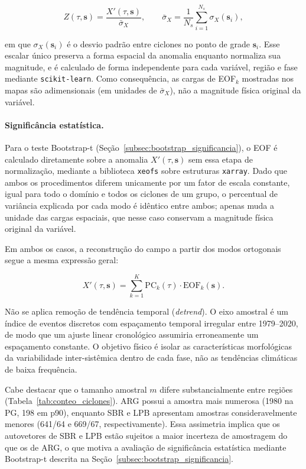 \begin{equation}\label{eq:eof_normalizacion}
    Z(\tau, \mathbf{s}) = \frac{X'(\tau, \mathbf{s})}{\bar{\sigma}_X}, \qquad \bar{\sigma}_X = \frac{1}{N_s}\sum_{i=1}^{N_s} \sigma_X(\mathbf{s}_i),
\end{equation}

em que $\sigma_X(\mathbf{s}_i)$ é o desvio padrão entre ciclones no ponto de grade $\mathbf{s}_i$. Esse escalar único preserva a forma espacial da anomalia enquanto normaliza sua magnitude, e é calculado de forma independente para cada variável, região e fase mediante \texttt{scikit-learn}. Como consequência, as cargas de EOF$_k$ mostradas nos mapas são adimensionais (em unidades de $\bar\sigma_X$), não a magnitude física original da variável.

\paragraph{Significância estatística.} Para o teste Bootstrap-t (Seção~\ref{subsec:bootstrap_significancia}), o EOF é calculado diretamente sobre a anomalia $X'(\tau,\mathbf{s})$ sem essa etapa de normalização, mediante a biblioteca \texttt{xeofs} \citep{rieger2024xeofs} sobre estruturas \texttt{xarray}. Dado que ambos os procedimentos diferem unicamente por um fator de escala constante, igual para todo o domínio e todos os ciclones de um grupo, o percentual de variância explicada por cada modo é idêntico entre ambos; apenas muda a unidade das cargas espaciais, que nesse caso conservam a magnitude física original da variável.

Em ambos os casos, a reconstrução do campo a partir dos modos ortogonais segue a mesma expressão geral:

\begin{equation}\label{eq:eof_reconstruccion}
    X'(\tau, \mathbf{s}) = \sum_{k=1}^{K} \text{PC}_k(\tau) \cdot \text{EOF}_k(\mathbf{s}).
\end{equation}

Não se aplica remoção de tendência temporal (\textit{detrend}). O eixo amostral é um índice de eventos discretos com espaçamento temporal irregular entre 1979--2020, de modo que um ajuste linear cronológico assumiria erroneamente um espaçamento constante. O objetivo físico é isolar as características morfológicas da variabilidade inter-sistêmica dentro de cada fase, não as tendências climáticas de baixa frequência.

Cabe destacar que o tamanho amostral $m$ difere substancialmente entre regiões (Tabela~\ref{tab:conteo_ciclones}). ARG possui a amostra mais numerosa (1980 na PG, 198 em p90), enquanto SBR e LPB apresentam amostras consideravelmente menores (641/64 e 669/67, respectivamente). Essa assimetria implica que os autovetores de SBR e LPB estão sujeitos a maior incerteza de amostragem do que os de ARG, o que motiva a avaliação de significância estatística mediante Bootstrap-t descrita na Seção~\ref{subsec:bootstrap_significancia}.

